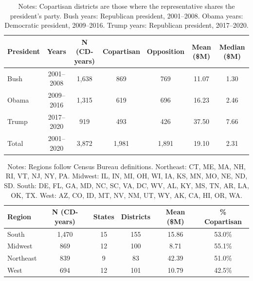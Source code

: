 \documentclass[12pt,letterpaper,oneside]{book}
\begin{document}
\begin{table}[H]
\centering
\caption{Sample Composition by Presidential Administration}
\label{tab:sample_president}
\begin{tabular}{lcccccc}
\toprule
President & Years & N (CD-years) & Copartisan & Opposition & Mean (\$M) & Median (\$M) \\
\midrule
Bush & 2001--2008 & 1,638 & 869 & 769 & 11.07 & 1.30 \\
Obama & 2009--2016 & 1,315 & 619 & 696 & 16.23 & 2.46 \\
Trump & 2017--2020 & 919 & 493 & 426 & 37.50 & 7.66 \\
\midrule
Total & 2001--2020 & 3,872 & 1,981 & 1,891 & 19.10 & 2.31 \\
\bottomrule
\end{tabular}
\caption*{\footnotesize Notes: Copartisan districts are those where the representative shares the president's party. Bush years: Republican president, 2001--2008. Obama years: Democratic president, 2009--2016. Trump years: Republican president, 2017--2020.}
\end{table}

\begin{table}[H]
\centering
\caption{Sample Composition by Census Region}
\label{tab:sample_region}
\begin{tabular}{lccccc}
\toprule
Region & N (CD-years) & States & Districts & Mean (\$M) & \% Copartisan \\
\midrule
South & 1,470 & 15 & 155 & 15.86 & 53.0\% \\
Midwest & 869 & 12 & 100 & 8.71 & 55.1\% \\
Northeast & 839 & 9 & 83 & 42.39 & 51.0\% \\
West & 694 & 12 & 101 & 10.79 & 42.5\% \\
\bottomrule
\end{tabular}
\caption*{\footnotesize Notes: Regions follow Census Bureau definitions. Northeast: CT, ME, MA, NH, RI, VT, NJ, NY, PA. Midwest: IL, IN, MI, OH, WI, IA, KS, MN, MO, NE, ND, SD. South: DE, FL, GA, MD, NC, SC, VA, DC, WV, AL, KY, MS, TN, AR, LA, OK, TX. West: AZ, CO, ID, MT, NV, NM, UT, WY, AK, CA, HI, OR, WA.}
\end{table}
\end{document}
